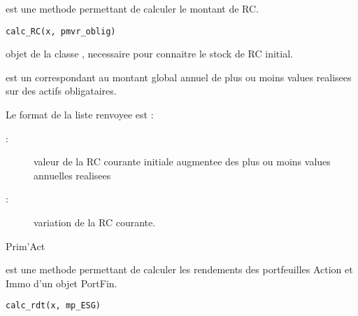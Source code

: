 \documentclass[a4paper]{book}
\begin{document}
%
\begin{Description}\relax
{} est une methode permettant de calculer le montant de RC.
\end{Description}
%
\begin{Usage}
\begin{verbatim}
calc_RC(x, pmvr_oblig)
\end{verbatim}
\end{Usage}
%
\begin{Arguments}
\begin{ldescription}
\item[\code{x}] objet de la classe , necessaire pour connaitre le stock de RC initial.

\item[\code{pmr\_oblig}] est un  correspondant au montant global annuel de plus ou moins values realisees sur des actifs obligataires.
\end{ldescription}
\end{Arguments}
%
\begin{Value}
Le format de la liste renvoyee est :
\begin{description}

\item[ : ]  valeur de la RC courante initiale augmentee des plus ou moins values annuelles realisees
\item[ : ]  variation de la RC courante.

\end{description}

\end{Value}
%
\begin{Author}\relax
Prim'Act
\end{Author}
%
\begin{Description}\relax
{} est une methode permettant de calculer les rendements des portfeuilles Action et Immo d'un objet PortFin.
\end{Description}
%
\begin{Usage}
\begin{verbatim}
calc_rdt(x, mp_ESG)
\end{verbatim}
\end{Usage}
\end{document}
